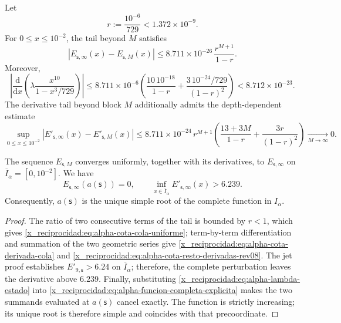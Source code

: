 Let
\[
 r:=\frac{10^{-6}}{729}<1.372\mathbin{\times}10^{-9}.
\]
For \(0\leq x\leq10^{-2}\), the tail beyond \(M\) satisfies
\begin{equation}
 \left|E_{\mathsf s,\infty}(x)-E_{\mathsf s,M}(x)\right|
 \leq
 8.711\mathbin{\times}10^{-26}\,\frac{r^{M+1}}{1-r}.
 \label{x_reciprocidad:eq:alpha-cota-cola-uniforme}
\end{equation}
Moreover,
\begin{equation}
 \left|\frac{\mathrm d}{\mathrm dx}
  \left(\lambda\frac{x^{10}}{1-x^3/729}\right)\right|
 \leq 8.711\mathbin{\times}10^{-6}
 \left(\frac{10\,10^{-18}}{1-r}
 +\frac{3\,10^{-24}/729}{(1-r)^2}\right)
 <8.712\mathbin{\times}10^{-23}.
 \label{x_reciprocidad:eq:alpha-cota-derivada-cola}
\end{equation}
The derivative tail beyond block \(M\) additionally admits the
depth-dependent estimate
\begin{equation}
 \sup_{0\le x\le10^{-2}}
 \left|E'_{\mathsf s,\infty}(x)-E'_{\mathsf s,M}(x)\right|
 \le 8.711\mathbin{\times}10^{-24}\,r^{M+1}
 \left(\frac{13+3M}{1-r}+\frac{3r}{(1-r)^2}\right)
 \xrightarrow[M\to\infty]{}0.
 \label{x_reciprocidad:eq:alpha-cota-resto-derivadas-rev08}
\end{equation}

\begin{theorem}
\label{x_reciprocidad:thm:alpha-raiz-completa-explicita}
The sequence \(E_{\mathsf s,M}\) converges uniformly, together with its
derivatives, to \(E_{\mathsf s,\infty}\) on
\(\overline I_\alpha=[0,10^{-2}]\). We have
\begin{equation}
 E_{\mathsf s,\infty}(a(\mathsf s))=0,
 \qquad
 \inf_{x\in\overline I_\alpha}
 E'_{\mathsf s,\infty}(x)>6.239.
 \label{x_reciprocidad:eq:alpha-raiz-y-derivada-completas}
\end{equation}
Consequently, \(a(\mathsf s)\) is the unique simple root of the complete
function in \(I_\alpha\).
\end{theorem}

\begin{proof}
The ratio of two consecutive terms of the tail is bounded by \(r<1\),
which gives \eqref{x_reciprocidad:eq:alpha-cota-cola-uniforme}; term-by-term differentiation
and summation of the two geometric series give
\eqref{x_reciprocidad:eq:alpha-cota-derivada-cola} and
\eqref{x_reciprocidad:eq:alpha-cota-resto-derivadas-rev08}. The jet proof establishes
\(E'_{9,\mathsf s}>6.24\) on \(\overline I_\alpha\); therefore, the
complete perturbation leaves the derivative above \(6.239\).
Finally, substituting \eqref{x_reciprocidad:eq:alpha-lambda-estado} into
\eqref{x_reciprocidad:eq:alpha-funcion-completa-explicita} makes the two summands evaluated at
\(a(\mathsf s)\) cancel exactly. The function is strictly
increasing; its unique root is therefore simple and coincides with that precoordinate.
\end{proof}


